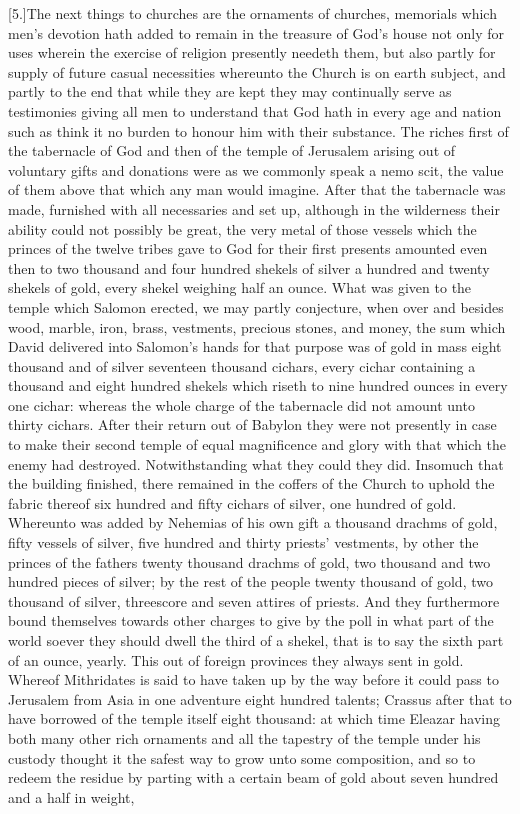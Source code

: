 [5.]The next things to churches are the ornaments of churches, memorials which men’s devotion hath added to remain in the treasure of God’s house not only for uses wherein the exercise of religion presently needeth them, but also partly for supply of future casual necessities whereunto the Church is on earth subject, and partly to the end that while they are kept they may continually serve as testimonies giving all men to understand that God hath in every age and nation such as think it no burden to honour him with their substance. The riches first of the tabernacle of God and then of the temple of Jerusalem arising out of voluntary gifts and donations were as we commonly speak a nemo scit, the value of them above that which any man would imagine. After that the tabernacle was made, furnished with all necessaries and set up, although in the wilderness their ability could not possibly be great, the very metal of those vessels which the princes of the twelve tribes gave to God for their first presents amounted even then to two thousand and four hundred shekels of silver a hundred and twenty shekels of gold, every shekel weighing half an ounce. What was given to the temple which Salomon erected, we may partly conjecture, when over and besides wood, marble, iron, brass, vestments, precious stones, and money, the sum which David delivered into Salomon’s hands for that purpose was of gold in mass eight thousand and of silver seventeen thousand cichars, every cichar containing a thousand and eight hundred shekels which riseth to nine hundred ounces in every one cichar: whereas the whole charge of the tabernacle did not amount unto thirty cichars. After  their return out of Babylon they were not presently in case to make their second temple of equal magnificence and glory with that which the enemy had destroyed. Notwithstanding what they could they did. Insomuch that the building finished, there remained in the coffers of the Church to uphold the fabric thereof six hundred and fifty cichars of silver, one hundred of gold. Whereunto was added by Nehemias of his own gift a thousand drachms of gold, fifty vessels of silver, five hundred and thirty priests’ vestments, by other the princes of the fathers twenty thousand drachms of gold, two thousand and two hundred pieces of silver; by the rest of the people twenty thousand of gold, two thousand of silver, threescore and seven attires of priests. And they furthermore bound themselves towards other charges to give by the poll in what part of the world soever they should dwell the third of a shekel, that is to say the sixth part of an ounce, yearly. This out of foreign provinces they always sent in gold. Whereof Mithridates is said to have taken up by the way before it could pass to Jerusalem from Asia in one adventure eight hundred talents; Crassus after that to have borrowed of the temple itself eight thousand: at which time Eleazar having both many other rich ornaments and all the tapestry of the temple under his custody thought it the safest way to grow unto some composition, and so to redeem the residue by  parting with a certain beam of gold about seven hundred and a half in weight,
